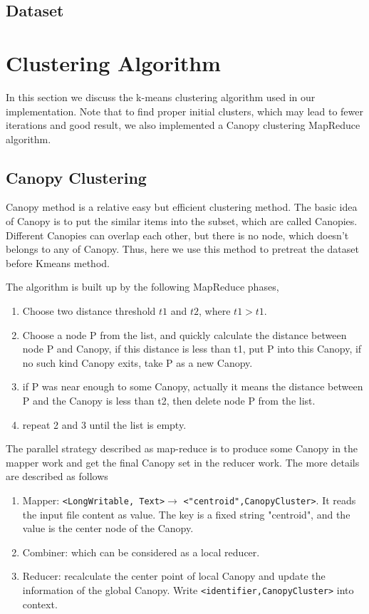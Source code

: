 \documentclass[a4paper,11pt]{article}
\begin{document}
\subsection{Dataset}

\section{Clustering Algorithm}
In this section we discuss the k-means clustering algorithm used in our
implementation. Note that to find proper initial clusters, which may lead to
fewer iterations and good result, we also implemented a Canopy clustering
MapReduce algorithm.
\subsection{Canopy Clustering}
Canopy method is a relative easy but efficient clustering method. The basic idea of Canopy is to put the similar items into the subset, which are called Canopies. Different Canopies can overlap each other, but there is no node, which doesn't belongs to any of Canopy. Thus, here we use this method to pretreat the dataset before Kmeans method.

The algorithm is built up by the following MapReduce phases,
\begin{enumerate}
  \item Choose two distance threshold $t1$ and $t2$, where $t1>t1$.	
  \item Choose a node P from the list, and quickly calculate the distance
  between node P and Canopy, if this distance is less than t1, put P into this
  Canopy, if no such kind Canopy exits, take P as a new Canopy.
  \item if P was near enough to some Canopy, actually it means the distance
  between P and the Canopy is less than t2, then delete node P from the list.
  \item repeat 2 and 3 until the list is empty.
\end{enumerate}
The parallel strategy described as map-reduce is to produce some Canopy in the
mapper work and get the final Canopy set in the reducer work. The more details
are described as follows

\begin{enumerate}
    \item Mapper: \verb|<LongWritable, Text>|$\rightarrow$
    \verb|<"centroid",CanopyCluster>|. It reads the input file content as
    value. The key is a fixed string "centroid", and the value is the center
    node of the Canopy.
    \item Combiner: which can be considered as a local reducer.
    \item Reducer: recalculate the center point of local Canopy and update the
    information of the global Canopy. Write \verb|<identifier,CanopyCluster>| into context.
\end{enumerate}
\end{document}
